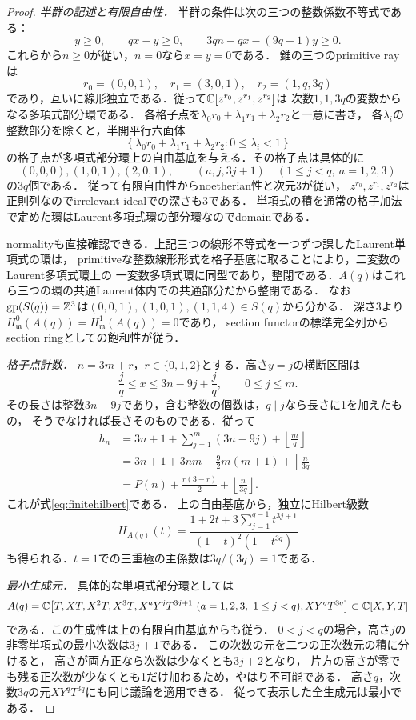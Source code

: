 \documentclass[11pt,a4paper]{ltjsarticle}
\begin{document}
\begin{proof}
\emph{半群の記述と有限自由性．}
半群の条件は次の三つの整数係数不等式である：
\[
 y\geq0,\qquad qx-y\geq0,\qquad
 3qn-qx-(9q-1)y\geq0.
\]
これらから$n\geq0$が従い，$n=0$なら$x=y=0$である．
錐の三つのprimitive rayは
\[
 r_0=(0,0,1),\quad r_1=(3,0,1),\quad r_2=(1,q,3q)
\]
であり，互いに線形独立である．従って$\mathbb C[z^{r_0},z^{r_1},z^{r_2}]$は
次数$1,1,3q$の変数からなる多項式部分環である．
各格子点を$\lambda_0r_0+\lambda_1r_1+\lambda_2r_2$と一意に書き，
各$\lambda_i$の整数部分を除くと，半開平行六面体
\[
 \left\{\lambda_0r_0+\lambda_1r_1+\lambda_2r_2:0\leq\lambda_i<1\right\}
\]
の格子点が多項式部分環上の自由基底を与える．その格子点は具体的に
\[
 (0,0,0),(1,0,1),(2,0,1),
 \qquad(a,j,3j+1)\quad(1\leq j<q,\ a=1,2,3)
\]
の$3q$個である．
従って有限自由性からnoetherian性と次元3が従い，
$z^{r_0},z^{r_1},z^{r_2}$は正則列なのでirrelevant idealでの深さも3である．
単項式の積を通常の格子加法で定めた環はLaurent多項式環の部分環なのでdomainである．

normalityも直接確認できる．上記三つの線形不等式を一つずつ課したLaurent単項式の環は，
primitiveな整数線形形式を格子基底に取ることにより，二変数のLaurent多項式環上の
一変数多項式環に同型であり，整閉である．$A(q)$はこれら三つの環の共通Laurent体内での共通部分だから整閉である．
なお$\operatorname{gp}(S(q))=\mathbb Z^3$は$(0,0,1),(1,0,1),(1,1,4)\in S(q)$から分かる．
深さ3より$H^0_{\mathfrak m}(A(q))=H^1_{\mathfrak m}(A(q))=0$であり，
section functorの標準完全列からsection ringとしての飽和性が従う．

\emph{格子点計数．}
$n=3m+r$，$r\in\{0,1,2\}$とする．高さ$y=j$の横断区間は
\[
 \frac jq\leq x\leq3n-9j+\frac jq,
 \qquad0\leq j\leq m.
\]
その長さは整数$3n-9j$であり，含む整数の個数は，$q\mid j$なら長さに1を加えたもの，
そうでなければ長さそのものである．従って
\begin{align*}
 h_n
 &=3n+1+\sum_{j=1}^{m}(3n-9j)+\left\lfloor\frac mq\right\rfloor\\
 &=3n+1+3nm-\frac92m(m+1)+\left\lfloor\frac n{3q}\right\rfloor\\
 &=P(n)+\frac{r(3-r)}2+\left\lfloor\frac n{3q}\right\rfloor.
\end{align*}
これが式\eqref{eq:finitehilbert}である．
上の自由基底から，独立にHilbert級数
\[
 H_{A(q)}(t)=
 \frac{1+2t+3\sum_{j=1}^{q-1}t^{3j+1}}{(1-t)^2(1-t^{3q})}
\]
も得られる．$t=1$での三重極の主係数は$3q/(3q)=1$である．

\emph{最小生成元．}
具体的な単項式部分環としては
\[
 A(q)=\mathbb C\bigl[T,XT,X^2T,X^3T,
       X^aY^jT^{3j+1}\ (a=1,2,3,\ 1\leq j<q),
       XY^qT^{3q}\bigr]\subset\mathbb C[X,Y,T]
\]
である．この生成性は上の有限自由基底からも従う．
$0<j<q$の場合，高さ$j$の非零単項式の最小次数は$3j+1$である．
この次数の元を二つの正次数元の積に分けると，
高さが両方正なら次数は少なくとも$3j+2$となり，
片方の高さが零でも残る正次数が少なくとも1だけ加わるため，やはり不可能である．
高さ$q$，次数$3q$の元$XY^qT^{3q}$にも同じ議論を適用できる．
従って表示した全生成元は最小である．
\end{proof}
\end{document}
